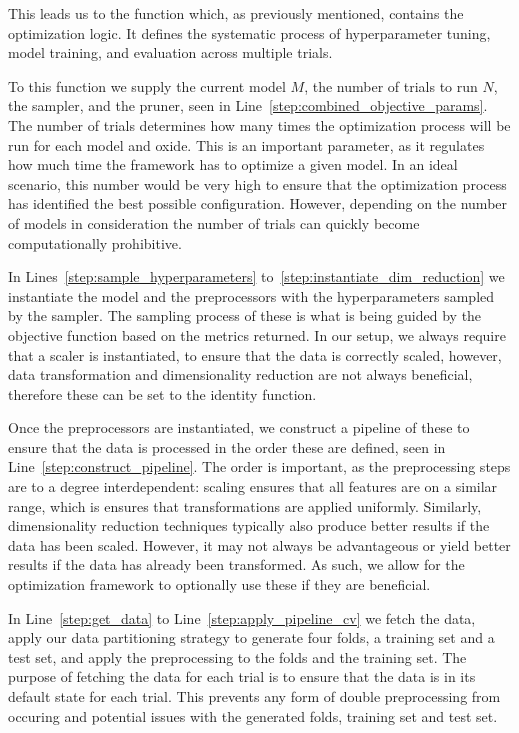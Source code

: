This leads us to the  function which, as previously mentioned, contains the optimization logic.
It defines the systematic process of hyperparameter tuning, model training, and evaluation across multiple trials.

To this function we supply the current model $M$, the number of trials to run $N$, the sampler, and the pruner, seen in Line~\ref{step:combined_objective_params}.
The number of trials determines how many times the optimization process will be run for each model and oxide.
This is an important parameter, as it regulates how much time the framework has to optimize a given model.
In an ideal scenario, this number would be very high to ensure that the optimization process has identified the best possible configuration.
However, depending on the number of models in consideration the number of trials can quickly become computationally prohibitive.

In Lines~\ref{step:sample_hyperparameters} to~\ref{step:instantiate_dim_reduction} we instantiate the model and the preprocessors with the hyperparameters sampled by the sampler.
The sampling process of these is what is being guided by the objective function based on the metrics returned.
In our setup, we always require that a scaler is instantiated, to ensure that the data is correctly scaled, however, data transformation and dimensionality reduction are not always beneficial, therefore these can be set to the identity function.

Once the preprocessors are instantiated, we construct a pipeline of these to ensure that the data is processed in the order these are defined, seen in Line~\ref{step:construct_pipeline}.
The order is important, as the preprocessing steps are to a degree interdependent: scaling ensures that all features are on a similar range, which is ensures that transformations are applied uniformly.
Similarly, dimensionality reduction techniques typically also produce better results if the data has been scaled.
However, it may not always be advantageous or yield better results if the data has already been transformed.
As such, we allow for the optimization framework to optionally use these if they are beneficial.

In Line~\ref{step:get_data} to Line~\ref{step:apply_pipeline_cv} we fetch the data, apply our data partitioning strategy to generate four folds, a training set and a test set, and apply the preprocessing to the folds and the training set.
The purpose of fetching the data for each trial is to ensure that the data is in its default state for each trial.
This prevents any form of double preprocessing from occuring and potential issues with the generated folds, training set and test set.

